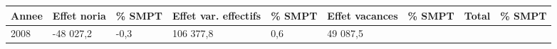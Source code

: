 \begin{longtable}[]{@{}lllllllll@{}}
\toprule
\begin{minipage}[b]{0.05\columnwidth}\raggedright
Annee\strut
\end{minipage} & \begin{minipage}[b]{0.10\columnwidth}\raggedright
Effet noria\strut
\end{minipage} & \begin{minipage}[b]{0.06\columnwidth}\raggedright
\% SMPT\strut
\end{minipage} & \begin{minipage}[b]{0.16\columnwidth}\raggedright
Effet var. effectifs\strut
\end{minipage} & \begin{minipage}[b]{0.06\columnwidth}\raggedright
\% SMPT\strut
\end{minipage} & \begin{minipage}[b]{0.12\columnwidth}\raggedright
Effet vacances\strut
\end{minipage} & \begin{minipage}[b]{0.06\columnwidth}\raggedright
\% SMPT\strut
\end{minipage} & \begin{minipage}[b]{0.09\columnwidth}\raggedright
Total\strut
\end{minipage} & \begin{minipage}[b]{0.06\columnwidth}\raggedright
\% SMPT\strut
\end{minipage}\tabularnewline
\midrule
\endhead
\begin{minipage}[t]{0.05\columnwidth}\raggedright
2008\strut
\end{minipage} & \begin{minipage}[t]{0.10\columnwidth}\raggedright
-48 027,2\strut
\end{minipage} & \begin{minipage}[t]{0.06\columnwidth}\raggedright
-0,3\strut
\end{minipage} & \begin{minipage}[t]{0.16\columnwidth}\raggedright
106 377,8\strut
\end{minipage} & \begin{minipage}[t]{0.06\columnwidth}\raggedright
0,6\strut
\end{minipage} & \begin{minipage}[t]{0.12\columnwidth}\raggedright
49 087,5\strut
\end{minipage} & \begin{minipage}[t]{0.06\columnwidth}\raggedright

\end{minipage}
\end{longtable}
